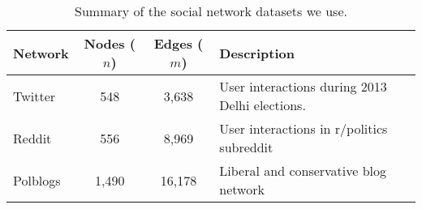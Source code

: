 

\begin{table}
\centering
\begin{tabular}{lccl}
\hline
Network & Nodes ($n$) & Edges ($m$) & Description \\
\hline
Twitter & 548 & 3,638 & User interactions during 2013 Delhi elections. \\
Reddit & 556 & 8,969 & User interactions in r/politics subreddit \\
Polblogs & 1,490 & 16,178 & Liberal and conservative blog network \\
\hline
\end{tabular}
\caption{Summary of the social network datasets we use.}
\label{tab:networks}
\end{table}


